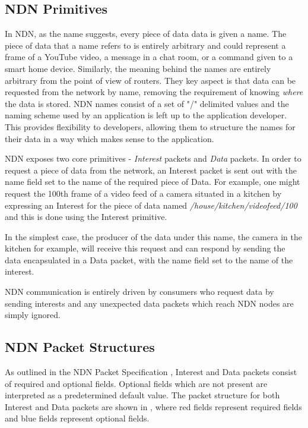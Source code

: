 \subsection{NDN Primitives}
In NDN, as the name suggests, every piece of data data is given a name. The piece of data that a name refers to is entirely arbitrary and could represent a frame of a YouTube video, a message in a chat room, or a command given to a smart home device. Similarly, the meaning behind the names are entirely arbitrary from the point of view of routers. They key aspect is that data can be requested from the network by name, removing the requirement of knowing \textit{where} the data is stored. NDN names consist of a set of "/" delimited values and the naming scheme used by an application is left up to the application developer. This provides flexibility to developers, allowing them to structure the names for their data in a way which makes sense to the application.

NDN exposes two core primitives - \textit{Interest} packets and \textit{Data} packets. In order to request a piece of data from the network, an Interest packet is sent out with the name field set to the name of the required piece of Data. For example, one might request the 100th frame of a video feed of a camera situated in a kitchen by expressing an Interest for the piece of data named \textit{/house/kitchen/videofeed/100} and this is done using the Interest primitive.

In the simplest case, the producer of the data under this name, the camera in the kitchen for example, will receive this request and can respond by sending the data encapsulated in a Data packet, with the name field set to the name of the interest.

NDN communication is entirely driven by consumers who request data by sending interests and any unexpected data packets which reach NDN nodes are simply ignored.








\subsection{NDN Packet Structures}\label{sec:ndn-packet-structure}
As outlined in the NDN Packet Specification \cite{ndn-packet-spec}, Interest and Data packets consist of required and optional fields. Optional fields which are not present are interpreted as a predetermined default value. The packet structure for both Interest and Data packets are shown in , where red fields represent required fields and blue fields represent optional fields.

